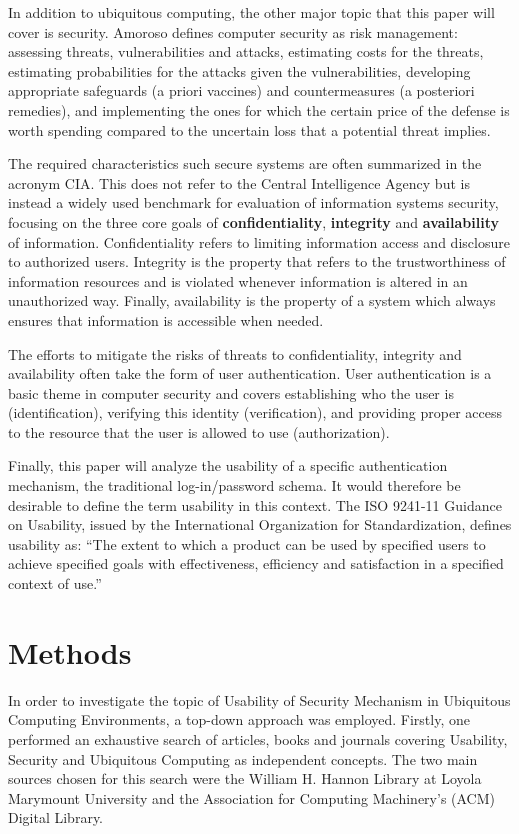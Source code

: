 \documentclass{article}
\begin{document}
In addition to ubiquitous computing, the other major topic that this paper will cover is security. Amoroso\cite{amoroso1994fundamentals} defines computer security as risk management: assessing threats, vulnerabilities and attacks, estimating costs for the threats, estimating probabilities for the attacks given the vulnerabilities, developing appropriate safeguards (a priori vaccines) and countermeasures (a posteriori remedies), and implementing the ones for which the certain price of the defense is worth spending compared to the uncertain loss that a potential threat implies. 

The required characteristics such secure systems are often summarized in the acronym CIA. This does not refer to the Central Intelligence Agency but is instead a widely used benchmark for evaluation of information systems security, focusing on the three core goals of \textbf{confidentiality}, \textbf{integrity} and \textbf{availability} of information. Confidentiality refers to limiting information access and disclosure to authorized users. Integrity is the property that refers to the trustworthiness of information resources and is violated whenever information is altered in an unauthorized way. Finally, availability is the property of a system which always ensures that information is accessible when needed. 

The efforts to mitigate the risks of threats to confidentiality, integrity and availability often take the form of user authentication. User authentication is a basic theme in computer security and covers establishing who the user is (identification), verifying this identity (verification), and providing proper access to the resource that the user is allowed to use (authorization). 

Finally, this paper will analyze the usability of a specific authentication mechanism, the traditional log-in/password schema. It would therefore be desirable to define the term usability in this context. The ISO 9241-11 Guidance on Usability, issued by the International Organization for Standardization, defines usability as: “The extent to which a product can be used by specified users to achieve specified goals with effectiveness, efficiency and satisfaction in a specified context of use.”\cite{iso1998international}

\section{Methods}
In order to investigate the topic of Usability of Security Mechanism in Ubiquitous Computing Environments, a top-down approach was employed. Firstly, one performed an exhaustive search of articles, books and journals covering Usability, Security and Ubiquitous Computing as independent concepts. The two main sources chosen for this search were the William H. Hannon Library at Loyola Marymount University and the Association for Computing Machinery’s (ACM) Digital Library.  
\end{document}
